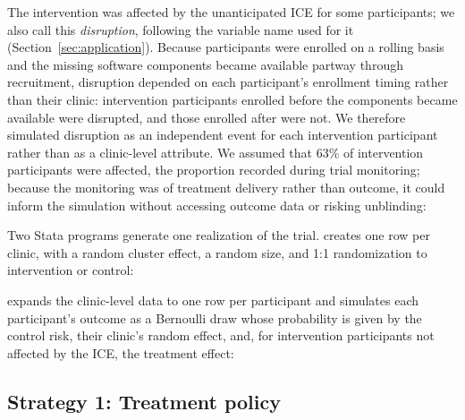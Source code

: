 The intervention was affected by the unanticipated ICE for some
participants; we also call this \emph{disruption}, following the variable
name used for it (Section~\ref{sec:application}). Because participants
were enrolled on a rolling basis and the missing software components
became available partway through recruitment, disruption depended on each
participant's enrollment timing rather than their clinic: intervention
participants enrolled before the components became available were
disrupted, and those enrolled after were not. We therefore simulated
disruption as an independent event for each intervention participant
rather than as a clinic-level attribute. We assumed that 63\% of
intervention participants were affected, the proportion recorded during
trial monitoring; because the monitoring was of treatment delivery rather
than outcome, it could inform the simulation without accessing outcome
data or risking unblinding:

\begin{minipage}{\linewidth}
\begin{stlog}
\nullskip
\end{stlog}
\end{minipage}

Two Stata programs generate one realization of the trial.
 creates one row per clinic, with a random
cluster effect, a random size, and 1:1 randomization to intervention or
control:

\begin{minipage}{\linewidth}
\begin{stlog}
\nullskip
\end{stlog}
\end{minipage}

 expands the clinic-level data to one row
per participant and simulates each participant's outcome as a Bernoulli
draw whose probability is given by the control risk, their clinic's
random effect, and, for intervention participants not affected by the
ICE, the treatment effect:

\begin{minipage}{\linewidth}
\begin{stlog}
\nullskip
\end{stlog}
\end{minipage}

\subsection{Strategy 1: Treatment policy}

